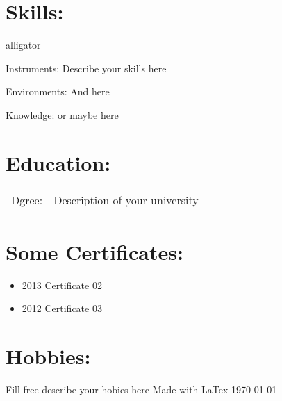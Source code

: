 \documentclass[a4paper,10pt]{article}
\begin{document}
\section*{Skills:}
\begin{labeling}{alligator}
  \item [Instruments:] Describe your skills here
  \item [Environments:] And here
  \item [Knowledge:] or maybe here
\end{labeling}
\section*{Education:}
\begin{tabular}{r|p{11cm}}
  Dgree: &  Description of your university
\end{tabular}
\section*{Some Certificates:}
\begin{itemize}
  \item 2013 Certificate 02
  \item 2012 Certificate 03
\end{itemize}
\section*{Hobbies:}
\textnormal{Fill free describe your hobies here}
\mbox{}
\vfill
\textcopyright Made with LaTex \today
\end{document}
